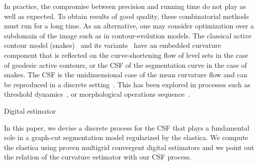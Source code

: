 \documentclass[smallextended]{svjour3}
\begin{document}
In practice, the compromise between precision and running time do not play as 
well as expected. To obtain results of good quality, these combinatorial methods must
run for a long time. As an alternative, one may consider optimization over a
subdomain of the image such as in contour-evolution models. The classical 
active contour model (snakes)~\cite{kass1988snakes} and its 
variants~\cite{caseles97geodesic,chan01} have an embedded curvature component 
that is reflected on the curve-shortening flow of level sets in the case of 
geodesic active contours, or the CSF of the segmentation curve in the case of 
snakes. The CSF is the unidimensional case of the mean curvature flow and can 
be reproduced in a discrete setting~\cite{merriman1992diffusion}. This has been 
explored in processes such as 
threshold dynamics~\cite{esedoglu2005threshold,esedoglu2008threshold}, or 
morphological operations sequence~\cite{marquezneila14}. 


Digital estimator


In this paper, we devise a discrete process for the CSF that plays a fundamental
role in a graph-cut segmentation model regularized by the elastica. We compute the
elastica using proven multigrid convergent digital estimators and we point out
the relation of the curvature estimator with our CSF process.
\end{document}
